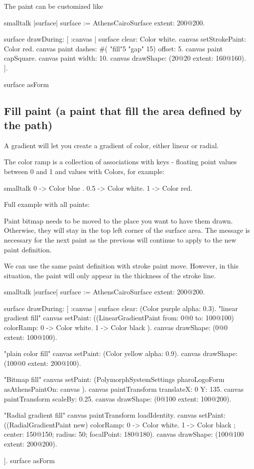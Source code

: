 \documentclass[10pt,twoside,english]{_support/latex/sbabook/sbabook}
\begin{document}
The paint can be customized like
\begin{displaycode}{smalltalk}
|surface|
surface := AthensCairoSurface extent: 200@200.

surface drawDuring: [ :canvas | 
        surface clear: Color white.
        canvas setStrokePaint:  Color red.
        canvas paint dashes: #( "fill"5   "gap" 15) offset: 5.
        canvas paint capSquare.
        canvas paint width: 10.
        canvas drawShape: (20@20 extent: 160@160). 
].

surface asForm
\end{displaycode}

\subsection{Fill paint (a paint that fill the area defined by the path)}
A gradient will let you create a gradient of color, either linear or radial.

The color ramp is a collection of associations with keys - floating point values
between 0 and 1 and values with Colors, for example:
\begin{displaycode}{smalltalk}
{0 -> Color blue . 0.5 -> Color white. 1 -> Color red}.
\end{displaycode}

Full example with all paints:

Paint bitmap needs to be moved to the place you want to have them drawn. Otherwise, they will stay in the top left corner of the surface area. The message  is necessary for the next paint as the previous  will continue to apply to the new paint definition.

We can use the same paint definition with stroke paint move. However, in this situation, the paint will only appear in the thickness of the stroke line.
\begin{displaycode}{smalltalk}
|surface|
surface := AthensCairoSurface extent: 200@200.

surface drawDuring: [ :canvas |
surface clear: (Color purple alpha: 0.3).
"linear gradient fill"
    canvas setPaint:  ((LinearGradientPaint from: 0@0  to: 100@100) colorRamp: {  0 -> Color white. 1 -> Color black }).
    canvas drawShape: (0@0 extent: 100@100).

"plain color fill"
    canvas setPaint:  (Color yellow alpha: 0.9).
    canvas drawShape: (100@0 extent: 200@100).

"Bitmap fill"
    canvas setPaint: (PolymorphSystemSettings pharoLogoForm asAthensPaintOn: canvas ).
    canvas paintTransform translateX: 0 Y: 135.
    canvas paintTransform scaleBy: 0.25.
    canvas drawShape: (0@100 extent: 100@200).

"Radial gradient fill"
    canvas paintTransform loadIdentity.
    canvas setPaint: ((RadialGradientPaint new) colorRamp: { 0 -> Color white. 1 -> Color black }; center: 150@150; radius: 50; focalPoint: 180@180).
    canvas drawShape: (100@100 extent: 200@200).

 ].
surface asForm 
\end{displaycode}
\end{document}
